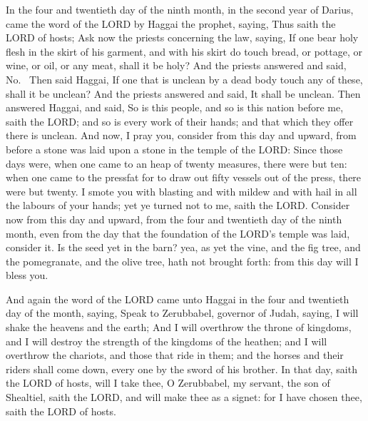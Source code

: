  In the four and twentieth day of the ninth month, in the
second year of Darius, came the word of the LORD by Haggai the prophet,
saying,  Thus saith the LORD of hosts; Ask now the priests
concerning the law, saying,  If one bear holy flesh in the
skirt of his garment, and with his skirt do touch bread, or pottage, or
wine, or oil, or any meat, shall it be holy? And the priests answered
and said, No.~ Then said Haggai, If one that is unclean by
a dead body touch any of these, shall it be unclean? And the priests
answered and said, It shall be unclean.  Then answered
Haggai, and said, So is this people, and so is this nation before me,
saith the LORD; and so is every work of their hands; and that which they
offer there is unclean.  And now, I pray you, consider from
this day and upward, from before a stone was laid upon a stone in the
temple of the LORD:  Since those days were, when one came
to an heap of twenty measures, there were but ten: when one came to the
pressfat for to draw out fifty vessels out of the press, there were but
twenty.  I smote you with blasting and with mildew and with
hail in all the labours of your hands; yet ye turned not to me, saith
the LORD.  Consider now from this day and upward, from the
four and twentieth day of the ninth month, even from the day that the
foundation of the LORD's temple was laid, consider it.  Is
the seed yet in the barn? yea, as yet the vine, and the fig tree, and
the pomegranate, and the olive tree, hath not brought forth: from this
day will I bless you.

 And again the word of the LORD came unto Haggai in the
four and twentieth day of the month, saying,  Speak to
Zerubbabel, governor of Judah, saying, I will shake the heavens and the
earth;  And I will overthrow the throne of kingdoms, and I
will destroy the strength of the kingdoms of the heathen; and I will
overthrow the chariots, and those that ride in them; and the horses and
their riders shall come down, every one by the sword of his brother.
 In that day, saith the LORD of hosts, will I take thee, O
Zerubbabel, my servant, the son of Shealtiel, saith the LORD, and will
make thee as a signet: for I have chosen thee, saith the LORD of hosts.

